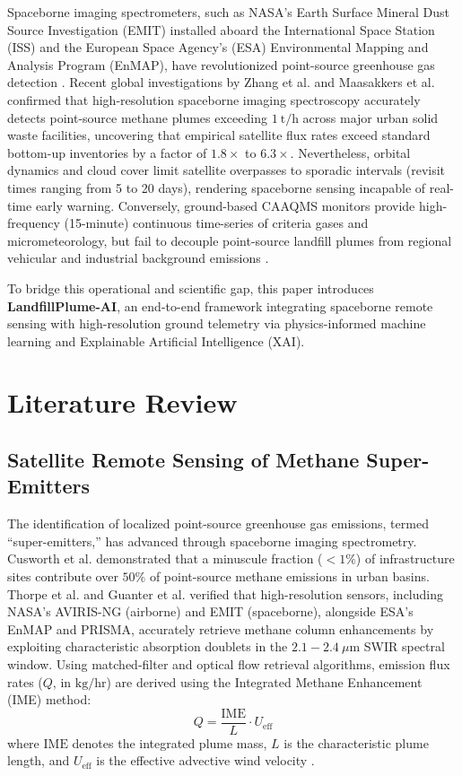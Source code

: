 \documentclass[conference]{IEEEtran}
\begin{document}
Spaceborne imaging spectrometers, such as NASA's Earth Surface Mineral Dust Source Investigation (EMIT) installed aboard the International Space Station (ISS) and the European Space Agency's (ESA) Environmental Mapping and Analysis Program (EnMAP), have revolutionized point-source greenhouse gas detection \cite{cusworth2020strong, thorpe2023attribution}. Recent global investigations by Zhang et al. \cite{zhang2025global} and Maasakkers et al. \cite{maasakkers2022using} confirmed that high-resolution spaceborne imaging spectroscopy accurately detects point-source methane plumes exceeding $1\ \text{t/h}$ across major urban solid waste facilities, uncovering that empirical satellite flux rates exceed standard bottom-up inventories by a factor of $1.8\times$ to $6.3\times$. Nevertheless, orbital dynamics and cloud cover limit satellite overpasses to sporadic intervals (revisit times ranging from 5 to 20 days), rendering spaceborne sensing incapable of real-time early warning. Conversely, ground-based CAAQMS monitors provide high-frequency (15-minute) continuous time-series of criteria gases and micrometeorology, but fail to decouple point-source landfill plumes from regional vehicular and industrial background emissions \cite{guttikunda2014nature, guttikunda2019air}.

To bridge this operational and scientific gap, this paper introduces \textbf{LandfillPlume-AI}, an end-to-end framework integrating spaceborne remote sensing with high-resolution ground telemetry via physics-informed machine learning and Explainable Artificial Intelligence (XAI).

\section{Literature Review}
\subsection{Satellite Remote Sensing of Methane Super-Emitters}
The identification of localized point-source greenhouse gas emissions, termed ``super-emitters,'' has advanced through spaceborne imaging spectrometry. Cusworth et al. \cite{cusworth2020strong} demonstrated that a minuscule fraction ($<1\%$) of infrastructure sites contribute over $50\%$ of point-source methane emissions in urban basins. Thorpe et al. \cite{thorpe2023attribution} and Guanter et al. \cite{guanter2023environmental} verified that high-resolution sensors, including NASA's AVIRIS-NG (airborne) and EMIT (spaceborne), alongside ESA's EnMAP and PRISMA, accurately retrieve methane column enhancements by exploiting characteristic absorption doublets in the $2.1 - 2.4\ \mu\text{m}$ SWIR spectral window. Using matched-filter and optical flow retrieval algorithms, emission flux rates ($Q$, in $\text{kg/hr}$) are derived using the Integrated Methane Enhancement (IME) method:
\begin{equation}
Q = \frac{\text{IME}}{L} \cdot U_{\text{eff}}
\end{equation}
where $\text{IME}$ denotes the integrated plume mass, $L$ is the characteristic plume length, and $U_{\text{eff}}$ is the effective advective wind velocity \cite{frankenberg2016airborne}. 
\end{document}
